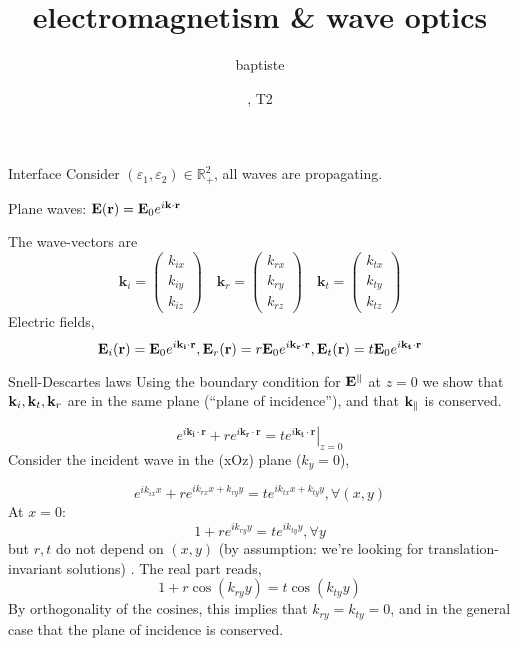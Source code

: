 \documentclass{article}
\title{electromagnetism \& wave optics}
\author{baptiste}
\date{\the\year, T2}
\begin{document}
\ifdefined\Shaded\renewenvironment{Shaded}{\begin{tcolorbox}[enhanced, interior hidden, sharp corners, breakable, frame hidden, borderline west={3pt}{0pt}{shadecolor}, boxrule=0pt]}{\end{tcolorbox}}\fi


\begin{frame}{Interface}
\protect\hypertarget{interface}{}
Consider
\(\left(\varepsilon_{1}, \varepsilon_{2}\right) \in \mathbb{R}_{+}^{2}\),
all waves are propagating.

Plane waves:
\(\mathbf{E}(\mathbf{r})=\mathbf{E}_{0} e^{i \mathbf{k} \cdot \mathbf{r}}\)

The wave-vectors are \[
\mathbf{k}_{i}=\left(\begin{array}{l}
k_{i x} \\
k_{i y} \\
k_{i z}
\end{array}\right) \quad \mathbf{k}_{r}=\left(\begin{array}{l}
k_{r x} \\
k_{r y} \\
k_{r z}
\end{array}\right) \quad \mathbf{k}_{t}=\left(\begin{array}{l}
k_{t x} \\
k_{t y} \\
k_{t z}
\end{array}\right)
\] Electric fields, \[
\mathbf{E}_i(\mathbf{r})=\mathbf{E}_{0} e^{i \mathbf{k_i} \cdot \mathbf{r}},\mathbf{E}_r(\mathbf{r})=r\mathbf{E}_{0} e^{i \mathbf{k_r} \cdot \mathbf{r}},\mathbf{E}_t(\mathbf{r})=t\mathbf{E}_{0} e^{i \mathbf{k_t} \cdot \mathbf{r}}
\]
\end{frame}

\begin{frame}{Snell-Descartes laws}
\protect\hypertarget{snell-descartes-laws}{}
Using the boundary condition for \(\mathbf{E}^\parallel\) at \(z=0\) we show
that \(\mathbf{k}_i,\mathbf{k}_t,\mathbf{k}_r\) are in the same plane (``plane of
incidence''), and that \(\mathbf{k}_\parallel\) is conserved.

\[
\left.e^{i \mathbf{k_i} \cdot \mathbf{r}} + r e^{i \mathbf{k_r} \cdot \mathbf{r}}=t e^{i \mathbf{k_t} \cdot \mathbf{r}}\right|_{z=0}
\] Consider the incident wave in the (xOz) plane (\(k_y=0\)),

\[
e^{i {k_{ix}x}} + r e^{i{k_{rx}x+k_{ry}y}} = t e^{i{k_{tx}x+k_{ty}y}}, \forall (x,y)
\] At \(x=0\): \[
1 + r e^{i{k_{ry}y}} = t e^{i{k_{ty}y}}, \forall y
\] but \(r,t\) do not depend on \((x,y)\) (by assumption: we're looking
for translation-invariant solutions) . The real part reads, \[
1 + r \cos(k_{ry}y) = t \cos({k_{ty}y})
\] By orthogonality of the cosines, this implies that
\(k_{ry}=k_{ty}=0\), and in the general case that the plane of incidence
is conserved.
\end{frame}
\end{document}
